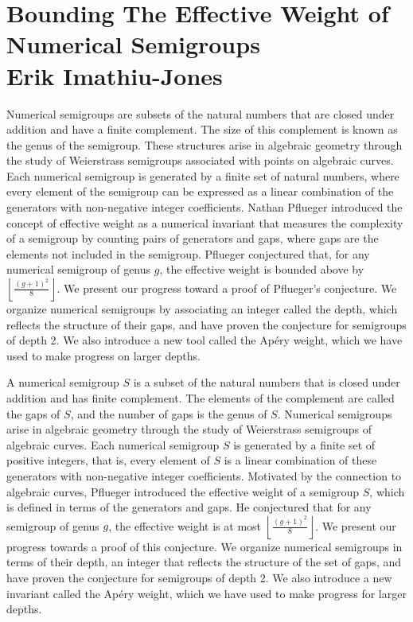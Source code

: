 \documentclass[11pt]{article}
\begin{document}
\section*{Bounding The Effective Weight of Numerical Semigroups\\
Erik Imathiu-Jones}

Numerical semigroups are subsets of the natural numbers that are closed under addition and have a finite complement. The size of this complement is known as the genus of the semigroup. These structures arise in algebraic geometry through the study of Weierstrass semigroups associated with points on algebraic curves. Each numerical semigroup is generated by a finite set of natural numbers, where every element of the semigroup can be expressed as a linear combination of the generators with non-negative integer coefficients. Nathan Pflueger introduced the concept of effective weight as a numerical invariant that measures the complexity of a semigroup by counting pairs of generators and gaps, where gaps are the elements not included in the semigroup. Pflueger conjectured that, for any numerical semigroup of genus \( g \), the effective weight is bounded above by \( \left\lfloor \frac{(g + 1)^2}{8} \right\rfloor \). We present our progress toward a proof of Pflueger's conjecture. We organize numerical semigroups by associating an integer called the depth, which reflects the structure of their gaps, and have proven the conjecture for semigroups of depth 2. We also introduce a new tool called the Apéry weight, which we have used to make progress on larger depths.

\newpage

A numerical semigroup \( S \) is a subset of the natural numbers that is closed under addition and has finite complement. The elements of the complement are called the gaps of \( S \), and the number of gaps is the genus of \( S \). Numerical semigroups arise in algebraic geometry through the study of Weierstrass semigroups of algebraic curves. Each numerical semigroup \( S \) is generated by a finite set of positive integers, that is, every element of \( S \) is a linear combination of these generators with non-negative integer coefficients. Motivated by the connection to algebraic curves, Pflueger introduced the effective weight of a semigroup \( S \), which is defined in terms of the generators and gaps. He conjectured that for any semigroup of genus \( g \), the effective weight is at most \( \left\lfloor \frac{(g+1)^2}{8} \right\rfloor \). We present our progress towards a proof of this conjecture. We organize numerical semigroups in terms of their depth, an integer that reflects the structure of the set of gaps, and have proven the conjecture for semigroups of depth 2. We also introduce a new invariant called the Apéry weight, which we have used to make progress for larger depths.
\end{document}
